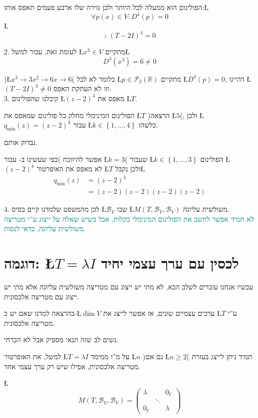 \documentclass[english,hebrew]{article}
\begin{document}
הפולינום הוא ממעלה לכל היותר {\endL} ולכן גזירה שלו ארבע
פעמים תאפס אותו:\L{%
\[
\forall p\left(x\right)\in V:D^{4}(p)=0
\]
}%
\L{%
\[
\therefore\ (T-2I)^{4}=0
\]
}%

2. לעומת זאת, עבור למשל \L{$x^{3}\in V$} מתקיים\L{%
\[
D^{3}(x^{3})=6\neq0
\]
}%

)\L{$x^{3}\to3x^{2}\to6x\to6$}( כלומר לא לכל \L{$p\in\mathcal{P}_{3}(\mathbb{R})$}
מתקיים \L{$D^{3}(p)=0$}, דהיינו \L{$(T-2I)^{3}\neq0$} וזו לא העתקת
האפס.\\

3. קיבלנו שהפולינום \L{$(z-2)^{4}$} מאפס את \L{$T$}.

הפולינום המינימלי מחלק כל פולינום שמאפס את \L{$T$} )הרצאה \L{$5$}(,
ולכן \L{$q_{\min}(z)=(z-2)^{k}$} עבור \L{$k\in\left\{ 1,\dots,4\right\} $}
כלשהו.

נבדוק אותם.

אפשר להיווכח )כפי שעשינו ב-{\endL} עבור \L{$k=3$}( שעבור
\L{$k\in\left\{ 1,\dots,3\right\} $} הפולינום \L{$\left(z-2\right)^{k}$}
לא מאפס את האופרטור \L{$T$} ולכן נקבל\L{%
\begin{align*}
q_{\min}(z) & =(z-2)^{4}\\
 & =(z-2)(z-2)(z-2)(z-2)
\end{align*}
}%

4. לכן מהמשפט שלמדנו קיים בסיס \L{$\mathcal{B}_{V}$} שבו \L{$M(T,\mathcal{B}_{V},\mathcal{B}_{V})$}
משולשית עליונה.\\

\textcolor{teal}{לא תמיד אפשר לחשב את הפולינום המינימלי בקלות, אבל
כשיש שאלה על ייצוג ע\textquotedblright י מטריצה משולשית עליונה, כדאי
לנסות.}

\section{דוגמה: \L{$T=\lambda I$} לכסין עם ערך עצמי יחיד}

עכשיו אנחנו עוברים לשלב הבא, לא מתי יש ייצוג עם מטריצה משולשית עליונה
אלא מתי יש ייצוג עם מטריצה אלכסונית.

בהרצאה {\endL} למדנו שאם יש כ-\L{$\dim V$} ערכים עצמיים
שונים, אז אפשר לייצג את \L{$T$} ע\textquotedblright י מטריצה אלכסונית.

נשים לב שזה תנאי מספיק אבל לא הכרחי.

למשל, את האופרטור \L{$T=\lambda I$} על מ\textquotedblright ו ממימד
\L{$n$} )גם אם \L{$n\ge2$}( תמיד ניתן לייצג בעזרת מטריצה אלכסונית,
אפילו שיש רק ערך עצמי אחד.

\L{%
\[
M(T,\mathcal{B}_{V},\mathcal{B}_{V})=\begin{pmatrix}\lambda &  & 0_{\mathbb{F}}\\
 & \ddots\\
0_{\mathbb{F}} &  & \lambda
\end{pmatrix}
\]
}%
\end{document}
